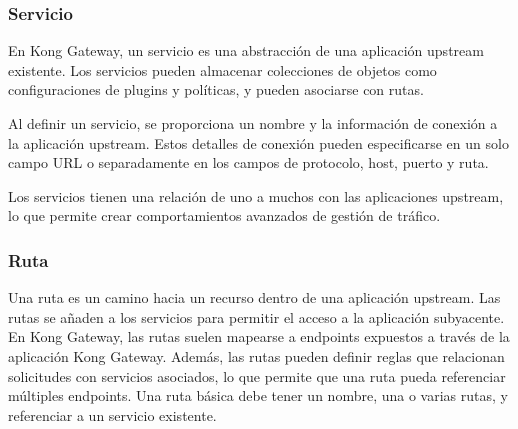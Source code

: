 \subsubsection*{Servicio}
En Kong Gateway, un servicio es una abstracción de una aplicación upstream existente. 
Los servicios pueden almacenar colecciones de objetos como configuraciones de plugins y políticas, y pueden asociarse con rutas.

Al definir un servicio, se proporciona un nombre y la información de conexión a 
la aplicación upstream. Estos detalles de conexión pueden especificarse en un solo 
campo URL o separadamente en los campos de protocolo, host, puerto y ruta.

Los servicios tienen una relación de uno a muchos con las aplicaciones upstream, 
lo que permite crear comportamientos avanzados de gestión de tráfico.

\subsubsection*{Ruta}

Una ruta es un camino hacia un recurso dentro de una aplicación upstream. 
Las rutas se añaden a los servicios para permitir el acceso a la aplicación subyacente. 
En Kong Gateway, las rutas suelen mapearse a endpoints expuestos a través de la aplicación Kong Gateway. 
Además, las rutas pueden definir reglas que relacionan solicitudes con servicios asociados, 
lo que permite que una ruta pueda referenciar múltiples endpoints. Una ruta básica debe tener un nombre, 
una o varias rutas, y referenciar a un servicio existente.


